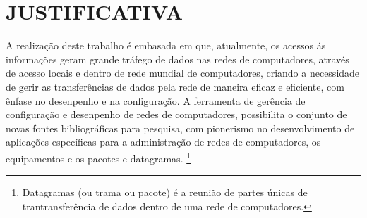 \chapter{JUSTIFICATIVA}


\par A realização deste trabalho é embasada em que, atualmente, os acessos ás
informações geram grande tráfego de dados nas redes de computadores, através de
acesso locais e dentro de rede mundial de computadores, criando a necessidade de
gerir as transferências de dados pela rede de maneira eficaz e eficiente, com
ênfase no desenpenho e na configuração. A ferramenta de gerência de configuração
e desenpenho de redes de computadores, possibilita o conjunto de novas fontes
bibliográficas para pesquisa, com pionerismo no desenvolvimento de aplicações
específicas para a administração de redes de computadores, os equipamentos e os
pacotes e datagramas. \footnote{Datagramas (ou trama ou pacote) é a
reunião de partes únicas de trantransferência de dados dentro de uma rede de computadores.}







